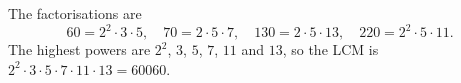 The factorisations are
\[60=2^2\cdot3\cdot5,\quad 70=2\cdot5\cdot7,\quad 130=2\cdot5\cdot13,\quad 220=2^2\cdot5\cdot11.\]
The highest powers are $2^2$, $3$, $5$, $7$, $11$ and $13$, so the LCM is $2^2\cdot3\cdot5\cdot7\cdot11\cdot13=\boxed{60060}$.
